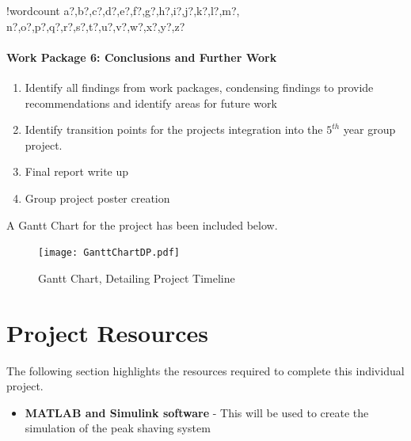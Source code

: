 \documentclass[10pt]{article}
\providecommand{\tightlist}{%
  \setlength{\itemsep}{0pt}\setlength{\parskip}{0pt}}
\let\oldparagraph\paragraph
\renewcommand{\paragraph}[1]{\oldparagraph{#1}\mbox{}}
\newcounter{words}
\newenvironment{counted}{%
  \setcounter{words}{0}
  \SearchList!{wordcount}{\stepcounter{words}}
    {a?,b?,c?,d?,e?,f?,g?,h?,i?,j?,k?,l?,m?,
    n?,o?,p?,q?,r?,s?,t?,u?,v?,w?,x?,y?,z?}
  \UndoBoundary{'}
  \SearchOrder{p;}}{%
  \StopSearching}
\begin{document}
\begin{counted}
\paragraph{Work Package 6: Conclusions and Further
Work}\label{work-package-6-conclusions-and-further-work}

\begin{enumerate}[label={6.\arabic*}]
\item Identify all findings from work packages, condensing findings to provide recommendations and identify areas for future work
\item Identify transition points for the projects integration into the $5^{th}$ year group project.
\item Final report write up
\item Group project poster creation
\end{enumerate}

A Gantt Chart for the project has been included below.

\newpage

\begin{landscape}

\begin{figure}[H]
\centering
\texttt{[image: GanttChartDP.pdf]}
\caption{Gantt Chart, Detailing Project Timeline}
\label{GanttChart}
\end{figure}

\end{landscape}

\newpage

\section{Project Resources}\label{project-resources}

The following section highlights the resources required to complete this
individual project.

\begin{itemize}
\tightlist
\item
  \textbf{MATLAB and Simulink software} - This will be used to create
  the simulation of the peak shaving system


\end{itemize}
\end{counted}
\end{document}
